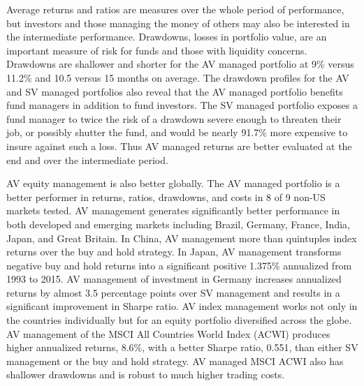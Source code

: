 Average returns and ratios are measures over the whole period of performance, but investors and those managing the money of others may also be interested in the intermediate performance. Drawdowns, losses in portfolio value, are an important measure of risk for funds and those with liquidity concerns. Drawdowns are shallower and shorter for the AV managed portfolio at 9\% versus 11.2\% and 10.5 versus 15 months on average. The drawdown profiles for the AV and SV managed portfolios also reveal that the AV managed portfolio benefits fund managers in addition to fund investors. The SV managed portfolio exposes a fund manager to twice the risk of a drawdown severe enough to threaten their job, or possibly shutter the fund, and would be nearly 91.7\% more expensive to insure against such a loss. Thus AV managed returns are better evaluated at the end and over the intermediate period.

AV equity management is also better globally. The AV managed portfolio is a better performer in returns, ratios, drawdowns, and costs in 8 of 9 non-US markets tested. AV management generates significantly better performance in both developed and emerging markets including Brazil, Germany, France, India, Japan, and Great Britain. In China, AV management more than quintuples index returns over the buy and hold strategy. In Japan, AV management transforms negative buy and hold returns into a significant positive 1.375\% annualized from 1993 to 2015. AV management of investment in Germany increases annualized returns by almost 3.5 percentage points over SV management and results in a significant improvement in Sharpe ratio. AV index management works not only in the countries individually but for an equity portfolio diversified across the globe. AV management of the MSCI All Countries World Index (ACWI) produces higher annualized returns, 8.6\%, with a better Sharpe ratio, 0.551, than either SV management or the buy and hold strategy. AV managed MSCI ACWI also has shallower drawdowns and is robust to much higher trading costs. 

